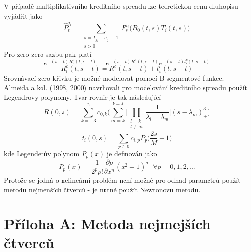 \documentclass[a4paper]{book}
\begin{document}
V případě multiplikativního kreditního spreadu lze teoretickou cenu dluhopisu vyjádřit jako
\begin{equation*}
\hat{P}_t^{j_i} = \sum_{\substack{s = T_{j_i} - \alpha_{j_i} + 1 \\ s > 0}}F_s^{j_i} \Big( B_0(t,s) T_i(t,s)\Big)
\end{equation*}
Pro zero zero sazbu pak platí
\begin{equation*}
e^{-(s-t)R_i^c(t,s-t)} = e^{-(s-t)R^c(t,s-t)}e^{-(s-t)t_i^c(t,s-t)}
\end{equation*}
\begin{equation*}
R_i^c(t,s-t) = R^c(t,s-t)+t_i^c(t,s-t)
\end{equation*}
Srovnávací zero křivku je možné modelovat pomocí B-segmentové funkce. Almeida a kol. (1998, 2000) navrhovali pro modelování kreditního spreadu použít Legendrovy polynomy. Tvar rovnic je tak následující 
\begin{equation*}
R(0,s) = \sum_{k=-3}^2 c_{0,k}\Bigg( \sum_{m=k}^{k+4}\Bigg[ \prod_{\substack{l = k \\ l \neq m}} \frac{1}{\lambda_l - \lambda_m}\Bigg](s - \lambda_m)_{+}^3 \Bigg)
\end{equation*}
\begin{equation*}
t_i(0,s) = \sum_{p \ge 0} c_{i,p} P_p \Big( \frac{2s}{M} - 1 \Big)
\end{equation*}
kde Legenderův polynom $P_p(x)$ je definován jako
\begin{equation*}
P_p(x) = \frac{1}{2^p p!}\frac{\partial p}{\partial x^n}(x^2 - 1)^p~~~\forall p = 0,1,2,...
\end{equation*}
Protože se jedná o nelineární problém není možné pro odhad parametrů použít metodu nejmenších čtverců - je nutné použít Newtonovu metodu.

\section{Příloha A: Metoda nejmejších čtverců}
\end{document}
